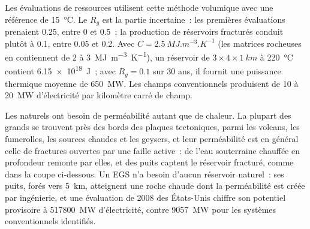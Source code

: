 Les évaluations de ressources utilisent cette méthode volumique avec une référence de \qty{15}{\celsius}. Le
 $R_g$ est la partie incertaine~: les premières évaluations prenaient 0.25, entre 0 et 0.5~;
la production de réservoirs fracturés conduit plutôt à 0.1, entre 0.05 et 0.2. Avec $C = \qty{2.5}{MJ.m^{-3}.K^{-1}}$
(les matrices rocheuses en contiennent de 2 à \qty{3}{MJ.m^{-3}.K^{-1}}), un réservoir de $3 \times 4 \times
\qty{1}{km}$ à \qty{220}{\celsius} contient \qty{6.15e18}{J}~; avec $R_g = 0.1$ sur 30 ans,
il fournit une puissance thermique moyenne de \qty{650}{MW}. Les champs conventionnels produisent de 10 à
\qty{20}{MW} d'électricité par kilomètre carré de champ.

Les  naturels ont besoin de perméabilité autant que de chaleur. La plupart des grands se trouvent
près des bords des plaques tectoniques, parmi les volcans, les fumerolles, les sources chaudes et les geysers,
et leur perméabilité est en général celle de fractures ouvertes par une faille active~: de l'eau souterraine chauffée
en profondeur remonte par elles, et des puits captent le réservoir fracturé, comme dans la coupe ci-dessous. Un EGS n'a besoin d'aucun réservoir naturel~:
ses puits, forés vers \qty{5}{km}, atteignent une roche chaude dont la perméabilité est créée par ingénierie, et
une évaluation de 2008 des États-Unis chiffre son potentiel provisoire à \qty{517800}{MW} d'électricité,
contre \qty{9057}{MW} pour les systèmes conventionnels identifiés.

